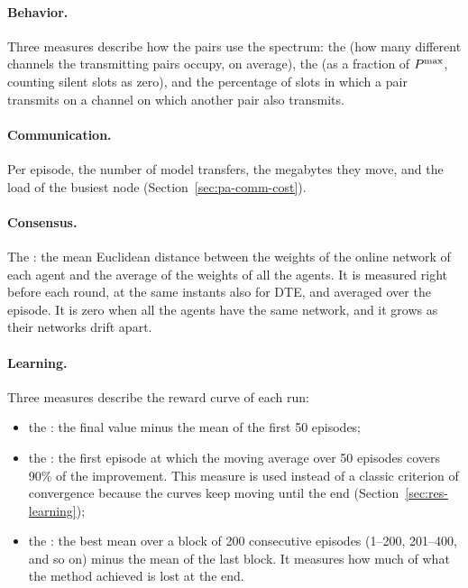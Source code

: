 \paragraph{Behavior.} Three measures describe how the pairs use the spectrum: the 
(how many different channels the transmitting pairs occupy, on average), the  (as a
fraction of $P^{\mathrm{max}}$, counting silent slots as zero), and the percentage of slots in which a pair transmits on a
channel on which another pair also transmits.

\paragraph{Communication.} Per episode, the number of model transfers, the megabytes they move, and the load
of the busiest node (Section~\ref{sec:pa-comm-cost}).

\paragraph{Consensus.} The : the mean Euclidean distance between the weights of
the online network of each agent and the average of the weights of all the agents. It is measured right
before each round, at the same instants also for \ac{DTE}, and averaged over the episode. It is zero when all
the agents have the same network, and it grows as their networks drift apart.

\paragraph{Learning.} Three measures describe the reward curve of each run:
\begin{itemize}[nosep]
  \item the : the final value minus the mean of the first 50 episodes;
  \item the : the first episode at which the moving average over 50 episodes covers 90\% of
    the improvement. This measure is used instead of a classic criterion of convergence because the curves
    keep moving until the end (Section~\ref{sec:res-learning});
  \item the : the best mean over a block of 200 consecutive episodes (1--200, 201--400,
    and so on) minus the mean of the last block. It measures how much of what the method achieved is lost at
    the end.
\end{itemize}

